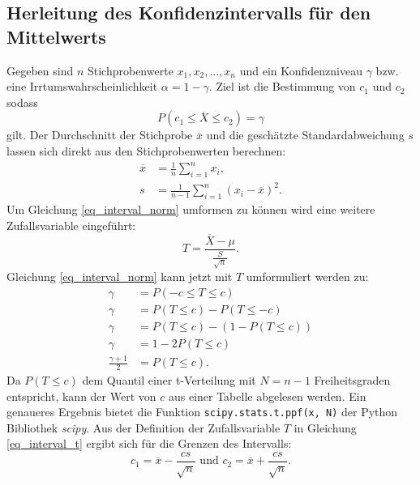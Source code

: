 \documentclass[10pt,twocolumn]{scrartcl}
\begin{document}
	\subsection{Herleitung des Konfidenzintervalls für den Mittelwerts }
		\label{chap_interval_mean_math}
		Gegeben sind $n$ Stichprobenwerte $x_1, x_2, ..., x_n$ und ein Konfidenzniveau $\gamma$ bzw. eine Irrtumswahrscheinlichkeit $\alpha = 1 - \gamma$.
		Ziel ist die Bestimmung von $c_1$ und $c_2$ sodass
		\begin{equation} \label{eq_interval_norm}
		P(c_1 \le \overline{X} \le c_2) = \gamma
		\end{equation}
		gilt.
		Der Durchschnitt der Stichprobe $\overline{x}$ und die geschätzte Standardabweichung $s$ lassen sich direkt aus den Stichprobenwerten berechnen:
		\begin{align}
		\overline{x} &=  \frac{1}{n} \sum_{i=1}^n{x_i} , \\
		s &= \frac{1}{n-1} \sum_{i=1}^n{(x_i - \overline{x})^2} .
		\end{align}
		Um Gleichung \ref{eq_interval_norm} umformen zu können wird eine weitere Zufallsvariable eingeführt:
		\begin{equation} \label{eq_interval_t}
		T = \frac{\overline{X} - \mu}{\frac{S}{\sqrt{n}}} .
		\end{equation}
		Gleichung \ref{eq_interval_norm} kann jetzt mit $T$ umformuliert werden zu:
		\begin{align}
		\gamma &= P(-c \le T \le c) \\ 
		\gamma &= P(T \le c) - P(T \le -c) \nonumber \\
		\gamma &= P(T \le c) - (1 - P(T \le c)) \nonumber \\
		\gamma &= 1 - 2 P(T \le c) \nonumber \\
		\frac{\gamma + 1}{2} &= P(T \le c) .
		\end{align}
		Da $P(T \le c)$ dem Quantil einer t-Verteilung mit $N = n-1$ Freiheitsgraden entspricht, kann der Wert von $c$ aus einer Tabelle abgelesen werden. Ein genaueres Ergebnis bietet die Funktion \texttt{scipy.stats.t.ppf(x, N)} der Python Bibliothek \textit{scipy}\cite{scipy}.
		Aus der Definition der Zufallsvariable $T$ in Gleichung \ref{eq_interval_t} ergibt sich für die Grenzen des Intervalls:
		\begin{equation}
		c_1 = \overline{x} - \frac{cs}{\sqrt{n}} \mbox{ und } c_2 = \overline{x} + \frac{cs}{\sqrt{n}}.
		\end{equation}
\end{document}
